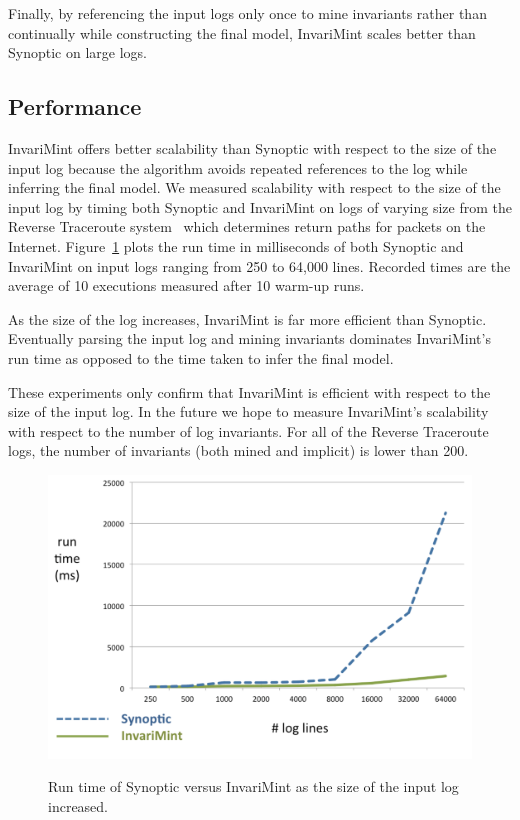 Finally, by referencing the input logs only once to mine invariants rather than continually
while constructing the final model, InvariMint scales better than
Synoptic on large logs.

\subsection{Performance}
InvariMint offers better scalability than Synoptic with respect to the size of
the input log because the algorithm avoids repeated references to the log while
inferring the final model. We measured scalability with respect to the size
of the input log by timing both Synoptic and InvariMint on logs of varying
size from the Reverse Traceroute system~\cite{ReverseTraceroute} which
determines return paths for packets on the Internet.
Figure~\ref{fig:performanceLogLine} plots the run time in milliseconds of both Synoptic and
InvariMint
on input logs ranging from 250 to 64,000 lines. 
Recorded times are the average of 10 executions measured after 10 warm-up
runs. 

As the size of the log increases, InvariMint is far more
efficient than Synoptic. Eventually parsing the input log and mining invariants dominates InvariMint's run
time as opposed
to the time taken to infer the final model.

These experiments only confirm that InvariMint is efficient with respect to the
size of the input log. In the future we hope to measure InvariMint's scalability
with respect to the number of log invariants. For all of the Reverse Traceroute logs,
the number of invariants (both mined and implicit) is lower than 200.

\begin{figure}
  \center
  {\includegraphics[width=\columnwidth]{fig/performanceLogLines.pdf}}
  \caption{Run time of Synoptic versus InvariMint as the size of the input log
  increased.}
  \label{fig:performanceLogLine}
\end{figure}

